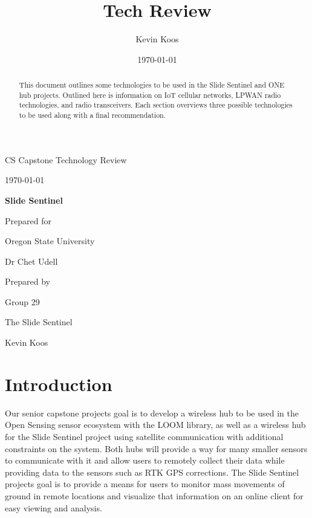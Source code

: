 \documentclass[draftclsnofoot,onecolumn, 10pt, compsoc]{IEEEtran}
\author{Kevin Koos}
\date{\today}
\title{Tech Review}
\def \CapstoneTeamName{		        The Slide Sentinel}
\def \CapstoneTeamNumber{		    29}
\def \GroupMemberOne{			    Kevin Koos}
\def \CapstoneProjectName{		    Slide Sentinel}
\def \CapstoneSponsorCompany{	    Oregon State University}
\def \CapstoneSponsorPerson{		Dr Chet Udell}
\def \DocType{	%
	Technology Review
}
\newcommand{\NameSigPair}[1]{\par
	\makebox[2.75in][r]{#1} \hfil 	\makebox[3.25in]{\makebox[2.25in]{\hrulefill} \hfill		\makebox[.75in]{\hrulefill}}
	\par\vspace{-12pt} \textit{\tiny\noindent
		\makebox[2.75in]{} \hfil		\makebox[3.25in]{\makebox[2.25in][r]{Signature} \hfill	\makebox[.75in][r]{Date}}}}
\renewcommand{\NameSigPair}[1]{#1}
\begin{document}
	\begin{titlepage}
		\begin{singlespace}
			\hfill 
			\par\vspace{.2in}
			\centering
			\scshape{
				\huge CS Capstone \DocType \par
				{\large\today}\par
				\vspace{.5in}
				\textbf{\Huge\CapstoneProjectName}\par
				\vfill
				{\large Prepared for}\par
				\Huge \CapstoneSponsorCompany\par
				\vspace{5pt}
				{\Large\NameSigPair{\CapstoneSponsorPerson}\par}
				{\large Prepared by }\par
				Group\CapstoneTeamNumber\par
				\CapstoneTeamName\par 
				\vspace{5pt}
				{\Large
					\NameSigPair{\GroupMemberOne}\par
				}
				\vspace{20pt}
			}
			\begin{abstract}
				This document outlines some technologies to be used in the Slide Sentinel and ONE hub projects. Outlined here is information on IoT cellular networks, LPWAN radio technologies, and radio transceivers. Each section overviews three possible technologies to be used along with a final recommendation.
			\end{abstract}     
		\end{singlespace}
	\end{titlepage}
	
	\newpage
	\tableofcontents
	

	\section{Introduction}
	Our senior capstone projects goal is to develop a wireless hub to be used in the Open Sensing sensor ecosystem with the LOOM library, as well as a wireless hub for the Slide Sentinel project using satellite communication with additional constraints on the system. Both hubs will provide a way for many smaller sensors to communicate with it and allow users to remotely collect their data while providing data to the sensors such as RTK GPS corrections. The Slide Sentinel projects goal is to provide a means for users to monitor mass movements of ground in remote locations and visualize that information on an online client for easy viewing and analysis.
	
\end{document}
